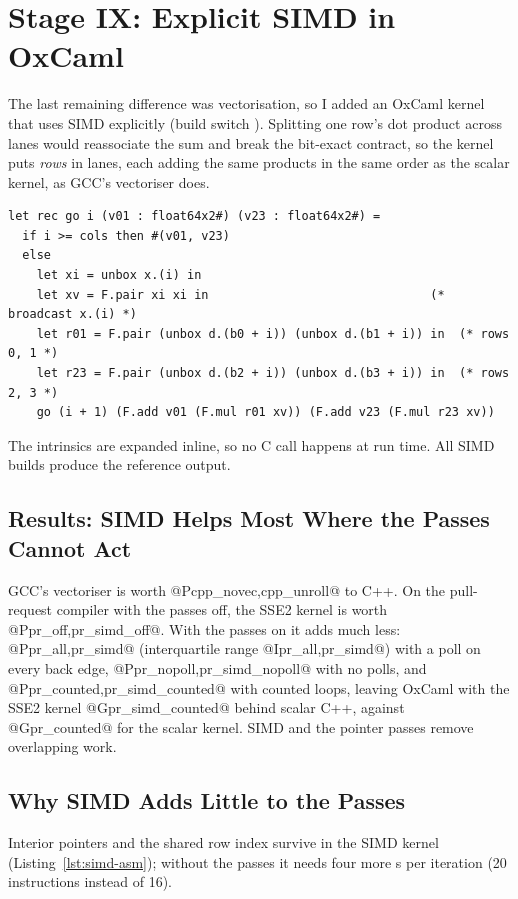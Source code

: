 \section{Stage IX: Explicit SIMD in OxCaml}
\label{sec:simd}

The last remaining difference was vectorisation, so I added an OxCaml kernel
that uses SIMD explicitly (build switch ). Splitting one row's
dot product across lanes would reassociate the sum and break the bit-exact
contract, so the kernel puts \emph{rows} in lanes, each adding the same
products in the same order as the scalar kernel, as GCC's vectoriser does.

\begin{lstlisting}[language=OCamlX,caption={The SSE2 kernel's inner loop. \texttt{F.add} and \texttt{F.mul} are \texttt{[@@builtin]} externals on the unboxed 128-bit type \texttt{float64x2\#}.},label=lst:simd]
let rec go i (v01 : float64x2#) (v23 : float64x2#) =
  if i >= cols then #(v01, v23)
  else
    let xi = unbox x.(i) in
    let xv = F.pair xi xi in                               (* broadcast x.(i) *)
    let r01 = F.pair (unbox d.(b0 + i)) (unbox d.(b1 + i)) in  (* rows 0, 1 *)
    let r23 = F.pair (unbox d.(b2 + i)) (unbox d.(b3 + i)) in  (* rows 2, 3 *)
    go (i + 1) (F.add v01 (F.mul r01 xv)) (F.add v23 (F.mul r23 xv))
\end{lstlisting}

The intrinsics are expanded inline, so no C call happens at run time. All
SIMD builds produce the reference output.

\subsection{Results: SIMD Helps Most Where the Passes Cannot Act}
\label{fig:interaction}
GCC's vectoriser is worth @P{cpp_novec,cpp_unroll}@ to C++. On the
pull-request compiler with the passes off, the SSE2 kernel is worth
@P{pr_off,pr_simd_off}@. With the passes on it adds much less:
@P{pr_all,pr_simd}@ (interquartile range @I{pr_all,pr_simd}@) with a poll on
every back edge, @P{pr_nopoll,pr_simd_nopoll}@ with no polls, and
@P{pr_counted,pr_simd_counted}@ with counted loops, leaving OxCaml with the
SSE2 kernel @G{pr_simd_counted}@ behind scalar C++, against @G{pr_counted}@
for the scalar kernel. SIMD and the pointer passes remove
overlapping work.

\subsection{Why SIMD Adds Little to the Passes}
\label{sec:simd-why}
Interior pointers and the shared row index survive in the SIMD kernel
(Listing~\ref{lst:simd-asm}); without the passes it needs four more
s per iteration (20 instructions instead of 16).

